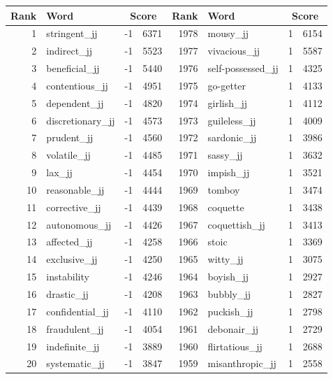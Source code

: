 \begin{table}[tbp]
    \begin{tabular}{| rlr@{.}l | rlr@{.}l |}
    \hline
    \textbf{Rank} & \textbf{Word} & \multicolumn{2}{c|}{\textbf{Score}} & \textbf{Rank} & \textbf{Word} & \multicolumn{2}{c|}{\textbf{Score}} \\
    \hline
    1 & stringent\_jj & -1 & 6371    &    1978 & mousy\_jj & 1 & 6154 \\
    2 & indirect\_jj & -1 & 5523    &    1977 & vivacious\_jj & 1 & 5587 \\
    3 & beneficial\_jj & -1 & 5440    &    1976 & self-possessed\_jj & 1 & 4325 \\
    4 & contentious\_jj & -1 & 4951    &    1975 & go-getter & 1 & 4133 \\
    5 & dependent\_jj & -1 & 4820    &    1974 & girlish\_jj & 1 & 4112 \\
    6 & discretionary\_jj & -1 & 4573    &    1973 & guileless\_jj & 1 & 4009 \\
    7 & prudent\_jj & -1 & 4560    &    1972 & sardonic\_jj & 1 & 3986 \\
    8 & volatile\_jj & -1 & 4485    &    1971 & sassy\_jj & 1 & 3632 \\
    9 & lax\_jj & -1 & 4454    &    1970 & impish\_jj & 1 & 3521 \\
    10 & reasonable\_jj & -1 & 4444    &    1969 & tomboy & 1 & 3474 \\
    11 & corrective\_jj & -1 & 4439    &    1968 & coquette & 1 & 3438 \\
    12 & autonomous\_jj & -1 & 4426    &    1967 & coquettish\_jj & 1 & 3413 \\
    13 & affected\_jj & -1 & 4258    &    1966 & stoic & 1 & 3369 \\
    14 & exclusive\_jj & -1 & 4250    &    1965 & witty\_jj & 1 & 3075 \\
    15 & instability & -1 & 4246    &    1964 & boyish\_jj & 1 & 2927 \\
    16 & drastic\_jj & -1 & 4208    &    1963 & bubbly\_jj & 1 & 2827 \\
    17 & confidential\_jj & -1 & 4110    &    1962 & puckish\_jj & 1 & 2798 \\
    18 & fraudulent\_jj & -1 & 4054    &    1961 & debonair\_jj & 1 & 2729 \\
    19 & indefinite\_jj & -1 & 3889    &    1960 & flirtatious\_jj & 1 & 2688 \\
    20 & systematic\_jj & -1 & 3847    &    1959 & misanthropic\_jj & 1 & 2558 \\

\end{tabular}
\end{table}
